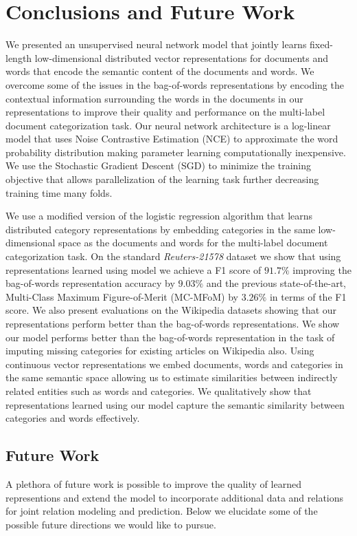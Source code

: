 \chapter{Conclusions and Future Work}
\label{chapter:conclusion}
We presented an unsupervised neural network model that jointly learns fixed-length low-dimensional distributed vector representations for documents and words that encode the semantic content of the documents and words.
We overcome some of the issues in the bag-of-words representations by encoding the contextual information surrounding the words in the documents in our representations to improve their quality and performance on the multi-label document categorization task.
Our neural network architecture is a log-linear model that uses Noise Contrastive Estimation (NCE) to approximate the word probability distribution making parameter learning computationally inexpensive. We use the Stochastic Gradient Descent (SGD) to minimize the training objective that allows parallelization of the learning task further decreasing training time many folds.

We use a modified version of the logistic regression algorithm that learns distributed category representations by embedding categories in the same low-dimensional space as the documents and words for the multi-label document categorization task. 
On the standard \emph{Reuters-21578} dataset we show that using representations learned using model we achieve a F1 score of $91.7\%$ improving the bag-of-words representation accuracy by $9.03\%$ and the previous state-of-the-art, Multi-Class Maximum Figure-of-Merit (MC-MFoM) by $3.26\%$ in terms of the F1 score. 
We also present evaluations on the Wikipedia datasets showing that our representations perform better than the bag-of-words representations. We show our model performs better than the bag-of-words representation in the task of imputing missing categories for existing articles on Wikipedia also.
Using continuous vector representations we embed documents, words and categories in the same semantic space allowing us to estimate similarities between indirectly related entities such as words and categories. We qualitatively show that representations learned using our model capture the semantic similarity between categories and words effectively.

\section{Future Work}
A plethora of future work is possible to improve the quality of learned representions and extend the model to incorporate additional data and relations for joint relation modeling and prediction. Below we elucidate some of the possible future directions we would like to pursue.  

